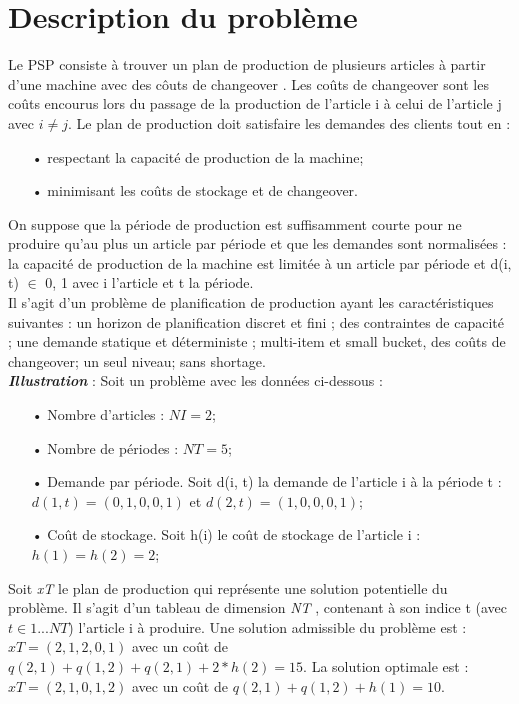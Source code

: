\documentclass[12pt,a4paper]{article}
\begin{document}
		\section{Description du problème}
		\label{sec:problem_description}
		Le PSP consiste à trouver un plan de production
de plusieurs articles à partir d’une machine avec des côuts de changeover . Les
coûts de changeover sont les coûts encourus lors du passage de la production
de l’article i à celui de l’article j avec $i \neq j$. Le plan de production doit
satisfaire les demandes des clients tout en :
	\begin{itemize}
		\item[•] respectant la capacité de production de la machine;
		\item[•] minimisant les coûts de stockage et de changeover.
	\end{itemize}
	\hspace*{.5cm} On suppose que la période de production est suffisamment courte pour ne produire qu’au plus un article par période et que les demandes sont normalisées : la capacité de production de la machine est limitée à un article par
période et d(i, t) $ \in $ {0, 1} avec i l’article et t la période.\\
	\hspace*{.5cm} Il s’agit d’un problème de planification de production ayant les caractéristiques suivantes : un horizon de planification discret et fini ; des contraintes de capacité ; une demande statique et déterministe ; multi-item et small bucket, des coûts de changeover; un seul niveau; sans shortage.\\

	\textbf{\textsl{Illustration}} : Soit un problème avec les données ci-dessous : \\
	\begin{itemize}
		\item[•] Nombre d’articles : $NI = 2$;
		\item[•] Nombre de périodes : $NT = 5$;
		\item[•] Demande par période. Soit d(i, t) la demande de l’article i à la période t : $d(1, t) = (0, 1, 0, 0, 1)$ et $d(2, t) = (1, 0, 0, 0, 1)$;
		\item[•] Coût de stockage. Soit h(i) le coût de stockage de l’article i : $h(1) = h(2) = 2$;
	\end{itemize}
	Soit \emph{xT} le plan de production qui représente une solution potentielle du problème. Il s’agit d’un tableau de dimension \emph{NT} , contenant à son indice t (avec $t  \in  {1...NT}$) l’article i à produire. Une solution admissible du problème est : $ xT = (2, 1, 2, 0, 1)$ avec un coût de $ q(2, 1) + q(1, 2) + q(2, 1) + 2 * h(2) = 15 $. La solution optimale est : $ xT = (2, 1, 0, 1, 2)$ avec un coût de $q(2, 1) + q(1, 2) + h(1) = 10$.
		
\end{document}
